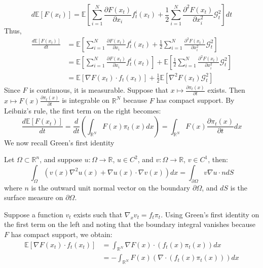 \documentclass[a4paper,10pt]{article}
\begin{document}
\[
d\mathbb{E}[F(x_t)] = \mathbb{E}\left[\sum\limits_{i=1}^N \frac{\partial F(x_t)}{\partial x_i} f^i_t(x_t) + \frac{1}{2} \sum\limits_{i=1}^N \frac{\partial^2 F(x_t)}{\partial x_i^2} \mathcal{G}_t^2\right]dt
\]
Thus,
\begin{align}
    \frac{d\mathbb{E}[F(x_t)]}{dt} &= \mathbb{E}\left[\sum\limits_{i=1}^N \frac{\partial F(x_t)}{\partial x_i} f^i_t(x_t) + \frac{1}{2} \sum\limits_{i=1}^N  \frac{\partial^2 F(x_t)}{\partial x_i^2}\mathcal{G}_t^2\right] \nonumber \\
    &= \mathbb{E}\left[\sum\limits_{i=1}^N \frac{\partial F(x_t)}{\partial x_i} f^i_t(x_t)\right] + \mathbb{E}\left[\frac{1}{2} \sum\limits_{i=1}^N  \frac{\partial^2 F(x_t)}{\partial x_i^2} \mathcal{G}_t^2\right] \nonumber\\
    &= \mathbb{E}[ \nabla F(x_t) \cdot f_t(x_t)] + \frac{1}{2}\mathbb{E}[\nabla^2 F(x_t) \mathcal{G}_t^2] \label{eq:EsperanceEgality}
\end{align}
Since \( F \) is continuous, it is measurable. Suppose that \( x \mapsto \frac{\partial\pi_t(x)}{\partial t} \) exists. Then \( x \mapsto F(x)\frac{\partial\pi_t(x)}{\partial t} \) is integrable on \( \mathbb{R}^N \) because \( F \) has compact support. By Leibniz's rule, the first term on the right becomes:
\[
\frac{d\mathbb{E}[F(x_t)]}{dt} = \frac{d}{dt} \left(\int_{\mathbb{R}^N} F(x) \pi_t(x) dx\right) = \int_{\mathbb{R}^N}F(x)\frac{\partial\pi_t(x)}{\partial t} dx
\]
\vspace{2em}
We now recall Green’s first identity
\begin{theorem}
Let \( \Omega \subset \mathbb{R}^n \), and suppose \( u : \Omega \rightarrow \mathbb{R} \), \( u \in C^2 \), and \( v : \Omega \rightarrow \mathbb{R} \), \( v \in C^1 \), then:
\begin{equation}\label{eq:GreenId}
\int_\Omega (v(x)\nabla^2 u(x) + \nabla u(x) \cdot \nabla v(x)) dx = \int_{\partial\Omega} v \nabla u \cdot n dS
\end{equation}
where \( n \) is the outward unit normal vector on the boundary \( \partial\Omega \), and \( dS \) is the surface measure on \( \partial\Omega \).
\end{theorem}
Suppose a function \( v_t \) exists such that \( \nabla_x v_t = f_t \pi_t \).
Using Green’s first identity on the first term on the left and noting that the boundary integral vanishes because \( F \) has compact support, we obtain:
\begin{align*}
    \mathbb{E}[\nabla F(x_t)\cdot f_t(x_t)] &=\int_{\mathbb{R}^N} \nabla F(x)\cdot (f_t(x) \pi_t(x)) dx \\
    &= - \int_{\mathbb{R}^N}F(x) (\nabla \cdot (f_t(x)\pi_t(x))) dx
\end{align*}
\end{document}

